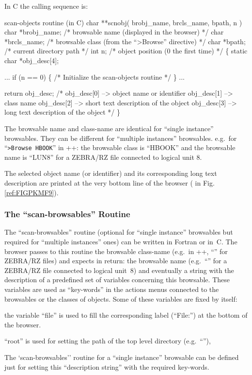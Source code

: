 \condbreak{4cm}

In C the calling sequence is:
\begin{XMPt} {scan-objects routine (in C)}
char **scnobj( brobj_name, brcls_name, bpath, n )
     char *brobj_name;  /* browsable name (displayed in the browser) */
     char *brcls_name;  /* browsable class (from the ``>Browse'' directive) */
     char *bpath;       /* current directory path */
     int n;             /* object position (0 the first time) */
\{
  static char     *obj_desc[4];

    ...
    if (n == 0) \{
       /* Initialize the scan-objects routine */
    \}
    ...

    return obj_desc;   /* obj_desc[0] --> object name or identifier
                          obj_desc[1] --> class name
                          obj_desc[2] --> short text description of the object
                          obj_desc[3] --> long text description of the object
                        */
\}
\end{XMPt}

The browsable name and class-name are identical for ``single instance'' 
browsables. They can be different for ``multiple instances'' browsables.
e.g.\ for ``{\tt >Browse HBOOK}'' in \PAW++{}: the browsable class is ``HBOOK'' 
and the browsable name is ``LUN8'' for a ZEBRA/RZ file connected to logical 
unit 8.

The selected object name (or identifier) and its corresponding long text 
description are printed at the very bottom line of the browser
( in Fig.\ref{ref:FIGPKMF9}).

\subsubsection{The ``scan-browsables'' Routine}
\label{ref:recdfscb}

The ``scan-browsables'' routine (optional for ``single instance'' browsables 
but required for ``multiple instances'' ones) can be written in Fortran or 
in~C.  The browser passes to this routine the browsable class-name (e.g.\ 
in \PAW++{}, ``'' for ZEBRA/RZ files) and expects in return: the browsable 
name (e.g.\  ``\Lit{LUN8}'' for a ZEBRA/RZ file connected to logical unit~8)
and eventually a string with the description of a predefined set of 
variables concerning this browsable. These variables are used as ``key-words''
in the actions menus connected to the browsables or the classes of objects. 
Some of these variables are fixed by \KUIPMotif{} itself:
\begin{UL}
\item
the variable ``file'' is used to fill the corresponding label (``File:'') 
at the bottom of the browser. 
\item
``root'' is used for setting the path of the top level directory 
(e.g.\ ``\Lit{//LUN8}''),
\end{UL}
The `scan-browsables'' routine for a ``single instance'' browsable can be 
defined just for setting this ``description string'' with the required
key-words.

